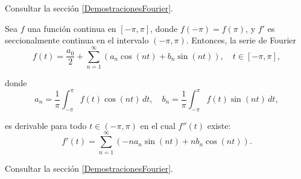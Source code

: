 \begin{demo}
Consultar la sección \ref{DemostracionesFourier}.
\end{demo}

\begin{teorema}[Derivación]
Sea $f$ una función continua en $[-\pi,\pi]$, donde $f(-\pi) = f(\pi)$, y $f'$ es seccionalmente continua en el intervalo $(-\pi,\pi)$. Entonces, la serie de Fourier
\begin{equation*}
    f(t) = \frac{a_0}{2} + \sum_{n=1}^{\infty} (a_n \cos(nt) + b_n \sin (nt) ), \quad t \in [-\pi,\pi],
\end{equation*}

donde 
$$a_n = \frac{1}{\pi} \int_{-\pi}^{\pi} f(t) \cos(nt) \,dt, \quad b_n = \frac{1}{\pi} \int_{-\pi}^{\pi} f(t) \sin(nt) \,dt,$$

es derivable para todo $t \in (-\pi,\pi)$ en el cual $f''(t)$ existe:
\begin{equation*}
    f'(t) = \sum_{n=1}^{\infty} (- n a_n \sin(nt) + nb_n \cos(nt)).
\end{equation*}
\end{teorema}

\begin{demo}
Consultar la sección \ref{DemostracionesFourier}.
\end{demo}

